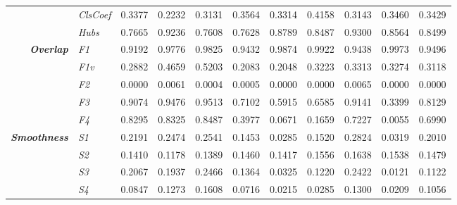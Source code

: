 \begin{center}
\begin{longtable}{ | r  l | c | c | c | c | c | c | c | c | c |}
& \emph{ClsCoef} & 
0.3377 & 0.2232 & 0.3131 & 0.3564 & 0.3314 & 0.4158 & 0.3143 & 0.3460 & 0.3429 \\
& \emph{Hubs} & 
0.7665 & 0.9236 & 0.7608 & 0.7628 & 0.8789 & 0.8487 & 0.9300 & 0.8564 & 0.8499 \\ 
\hline
\multirow{5}{*}{\emph{\textbf{Overlap}}} & \emph{F1} & 
0.9192 & 0.9776 & 0.9825 & 0.9432 & 0.9874 & 0.9922 & 0.9438 & 0.9973 & 0.9496 \\
& \emph{F1v} & 
0.2882 & 0.4659 & 0.5203 & 0.2083 & 0.2048 & 0.3223 & 0.3313 & 0.3274 & 0.3118 \\
& \emph{F2} & 
0.0000 & 0.0061 & 0.0004 & 0.0005 & 0.0000 & 0.0000 & 0.0065 & 0.0000 & 0.0000 \\
& \emph{F3} & 
0.9074 & 0.9476 & 0.9513 & 0.7102 & 0.5915 & 0.6585 & 0.9141 & 0.3399 & 0.8129 \\
& \emph{F4} & 
0.8295 & 0.8325 & 0.8487 & 0.3977 & 0.0671 & 0.1659 & 0.7227 & 0.0055 & 0.6990 \\
\hline
\multirow{4}{*}{\emph{\textbf{Smoothness}}} & \emph{S1} & 
0.2191 & 0.2474 & 0.2541 & 0.1453 & 0.0285 & 0.1520 & 0.2824 & 0.0319 & 0.2010 \\
& \emph{S2} & 
0.1410 & 0.1178 & 0.1389 & 0.1460 & 0.1417 & 0.1556 & 0.1638 & 0.1538 & 0.1479 \\
& \emph{S3} & 
0.2067 & 0.1937 & 0.2466 & 0.1364 & 0.0325 & 0.1220 & 0.2422 & 0.0121 & 0.1122 \\
& \emph{S4} & 
0.0847 & 0.1273 & 0.1608 & 0.0716 & 0.0215 & 0.0285 & 0.1300 & 0.0209 & 0.1056 \\

\hline
\end{longtable}
\end{center}
